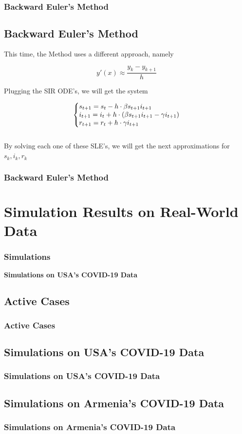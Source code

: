 \documentclass{beamer}
\makeatletter
\newenvironment{system}%
{\left\lbrace\begin{array}{@{}l@{}}}%
{\end{array}\right.}
\makeatother
\begin{document}
\begin{frame}\frametitle{Backward Euler's Method}
\subsection{Backward Euler's Method}
This time, the Method uses a different approach, namely

\begin{equation*}
	y'(x) \approx \frac{y_k-y_{k+1}}{h}
\end{equation*}

Plugging the SIR ODE's, we will get the system

    \begin{equation*}
        \begin{system}
        s_{t+1} = s_t - h \cdot \beta s_{t+1} i_{t+1}
        \\
        i_{t+1} = i_t + h \cdot (\beta s_{t+1} i_{t+1} - \gamma i_{t+1})
        \\
        r_{t+1}= r_t + h\cdot \gamma i_{t+1}
        \end{system}
    \end{equation*}
    \vspace{0.3cm}
\\
    By solving each one of these SLE's, we will get the next approximations for $s_k,i_k,r_k$
\end{frame}

\begin{frame}\frametitle{Backward Euler's Method}

\end{frame}

\section{Simulation Results on Real-World Data}
\begin{frame}\frametitle{Simulations}
    \begin{center}
        \textbf{Simulations on USA's COVID-19 Data}
    \end{center}
\end{frame}

\subsection{Active Cases}
\begin{frame}\frametitle{Active Cases}

\end{frame}

\subsection{Simulations on USA's COVID-19 Data}
\begin{frame}\frametitle{Simulations on USA's COVID-19 Data}

\end{frame}

\subsection{Simulations on Armenia's COVID-19 Data}
\begin{frame}\frametitle{Simulations on Armenia's COVID-19 Data}

\end{frame}
\end{document}
